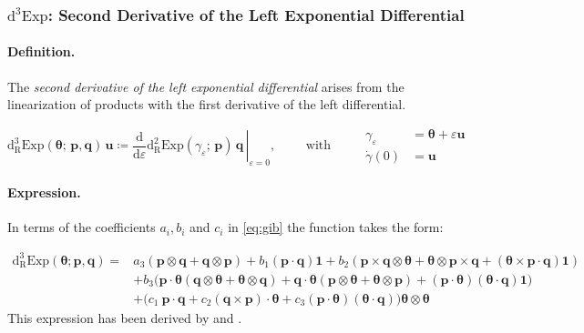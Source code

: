 \hypertarget{sec:dddExpSO3}{%
\subsubsection{\texorpdfstring{\(\operatorname{d^3Exp}\): Second
Derivative of the Left Exponential
Differential}{dddExpSO3: Second Derivative of the Left Exponential Differential}}\label{sec:dddExpSO3}}

\paragraph*{Definition.}
The \emph{second derivative of the left exponential differential} arises from the linearization
of products with the first derivative of the left differential. 

%
\begin{equation*} 
\operatorname{d^3_{\scriptscriptstyle{R}}Exp}\left(\bm{\theta}; \, \bm{p}, \bm{q}\right) \, \bm{u}
\coloneq \left.\frac{\mathrm{d}}{\mathrm{d}\varepsilon}\operatorname{d^2_{\scriptscriptstyle{R}}Exp}\left(\gamma_{\varepsilon}; \, \bm{p}\right) \, \bm{q} \,\right|_{\varepsilon=0} 
,\qquad\text{ with }\qquad
\begin{aligned}
\gamma_{\varepsilon} &= \bm{\theta} + \varepsilon \bm{u} \\
\dot{\gamma}(0) &= \bm{u}
\end{aligned}
\end{equation*}
 

\paragraph*{Expression.}

In terms of the coefficients \(a_i, b_i\) and \(c_i\) in \eqref{eq:gib}
the function takes the form:

\begin{equation}
\begin{aligned}
\operatorname{d^3_{\scriptscriptstyle{R}}Exp}\left(\bm{\theta};\bm{p}, \bm{q}\right)
= 
   & a_3(\bm{p} \otimes \bm{q}+\bm{q} \otimes \bm{p})
   + b_1(\bm{p} \cdot \bm{q}) \mathbf{1}
   + b_2(\bm{p}\times \bm{q} \otimes \bm{\theta}+\bm{\theta} \otimes \bm{p}\times\bm{q}+(\bm{\theta}\times \bm{p} \cdot \bm{q}) \mathbf{1}) \\
& +b_3\bigl(\bm{p} \cdot \bm{\theta}(\bm{q} \otimes \bm{\theta}+\bm{\theta} \otimes \bm{q}) + \bm{q} \cdot \bm{\theta} (\bm{p} \otimes \bm{\theta}+\bm{\theta} \otimes \bm{p})+\left(\bm{p} \cdot \bm{\theta}\right)(\bm{\theta} \cdot \bm{q}) \mathbf{1}\bigr) \\
& +\bigl(
    c_1 ~ \bm{p} \cdot \bm{q}
   +c_2(\bm{q}\times \bm{p}) \cdot \bm{\theta}
   +c_3\left(\bm{p} \cdot \bm{\theta}\right)(\bm{\theta} \cdot \bm{q})
  \bigr) \bm{\theta} \otimes \bm{\theta}
\end{aligned}
\label{eq:dddExpSO3}\end{equation}
%
This expression has been derived by
\cite{ibrahimbegović1995computational} and
\cite{ritto-corrêa2002differentiation}.

